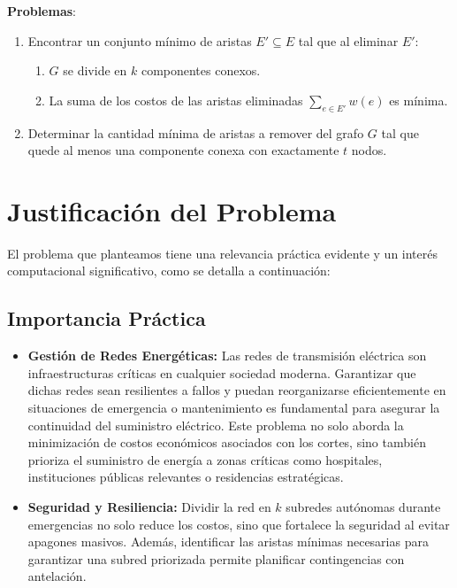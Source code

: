 \documentclass[a4paper, 12pt]{article}
\begin{document}
\noindent \textbf{Problemas}:
\begin{enumerate}
    \item Encontrar un conjunto mínimo de aristas \( E' \subseteq E \) tal que al eliminar \( E' \):
    \begin{enumerate}
        \item \( G \) se divide en \( k \) componentes conexos.
        \item La suma de los costos de las aristas eliminadas \( \sum_{e \in E'} w(e) \) es mínima.
    \end{enumerate}
    \item Determinar la cantidad mínima de aristas a remover del grafo \( G \) tal que quede al menos una componente conexa con exactamente \( t \) nodos.
\end{enumerate}

\section*{Justificación del Problema}

El problema que planteamos tiene una relevancia práctica evidente y un interés computacional significativo, como se detalla a continuación:

\subsection*{Importancia Práctica}
\begin{itemize}
    \item \textbf{Gestión de Redes Energéticas:} Las redes de transmisión eléctrica son infraestructuras críticas en cualquier sociedad moderna. Garantizar que dichas redes sean resilientes a fallos y puedan reorganizarse eficientemente en situaciones de emergencia o mantenimiento es fundamental para asegurar la continuidad del suministro eléctrico. Este problema no solo aborda la minimización de costos económicos asociados con los cortes, sino también prioriza el suministro de energía a zonas críticas como hospitales, instituciones públicas relevantes o residencias estratégicas.
    \item \textbf{Seguridad y Resiliencia:} Dividir la red en \(k\) subredes autónomas durante emergencias no solo reduce los costos, sino que fortalece la seguridad al evitar apagones masivos. Además, identificar las aristas mínimas necesarias para garantizar una subred priorizada permite planificar contingencias con antelación.
\end{itemize}
\end{document}

